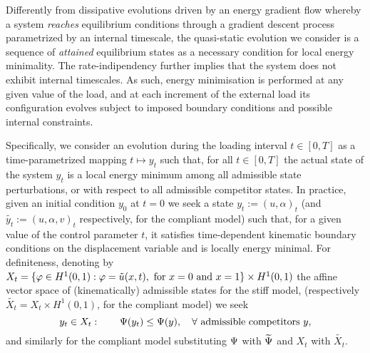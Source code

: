 Differently from dissipative evolutions driven by an energy gradient flow whereby a system \emph{reaches} equilibrium conditions through a gradient descent process parametrized by an internal timescale, the quasi-static evolution we consider is a sequence of \emph{attained} equilibrium states as a necessary condition for local energy minimality. 
The rate-indipendency further implies that the system does not exhibit internal timescales.
As such, energy minimisation is performed at any given value of the load, and at each increment of the external load its configuration evolves subject to imposed boundary conditions and possible internal constraints.
% 

Specifically, we consider an evolution during the loading interval $t\in [0, T]$ as a time-parametrized mapping $t\mapsto y_t$  such that, for all $t\in [0, T]$ the actual state of the system $y_t$ is a local energy minimum among all admissible state perturbations, or with respect to all admissible competitor states. %
In practice, given an initial condition $y_0$ at $t=0$ we seek a state $y_t:=(u, \alpha)_t$ (and $\widetilde{y_t}:=(u, \alpha, v)_t$ respectively, for the compliant model) such that, for a given value of the control parameter $t$, it satisfies time-dependent kinematic boundary conditions on the displacement variable and is locally energy minimal. 
For definiteness, denoting by $X_t = \{\varphi\in H^1(0, 1):\varphi=\tilde u(x, t),\text{ for } x=0\text{ and } x=1\}\times H^1(0,1)$ the affine vector space of (kinematically) admissible states for the stiff model, (respectively $\widetilde{X_t} = X_t\times H^1(0, 1)$, for the compliant model) 
we seek 
\begin{equation}
    \label{eq:variational_global_ineq}
    y_t\in X_t: \qquad \Psi(y_t) \leq \Psi(y),\quad \forall \text{ admissible competitors } y,
\end{equation}
and similarly for the compliant model substituting $\Psi$ with $\widetilde\Psi$ and $X_t$ with $\widetilde{X_t}$.
